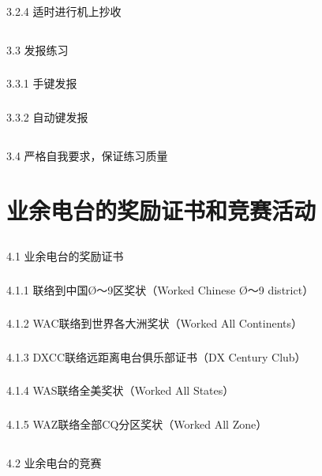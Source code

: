 \documentclass[12pt,UTF8]{ctexbook}
\begin{document}
\subsection{}3.2.4 适时进行机上抄收
\section{}3.3 发报练习
\subsection{}3.3.1 手键发报
\subsection{}3.3.2 自动键发报
\section{}3.4 严格自我要求，保证练习质量

\chapter{业余电台的奖励证书和竞赛活动}

\section{}4.1 业余电台的奖励证书
\subsection{}4.1.1 联络到中国Ø～9区奖状（Worked Chinese Ø～9 district）
\subsection{}4.1.2 WAC联络到世界各大洲奖状（Worked All Continents）
\subsection{}4.1.3 DXCC联络远距离电台俱乐部证书（DX Century Club）
\subsection{}4.1.4 WAS联络全美奖状（Worked All States）
\subsection{}4.1.5 WAZ联络全部CQ分区奖状（Worked All Zone）
\section{}4.2 业余电台的竞赛
\end{document}
